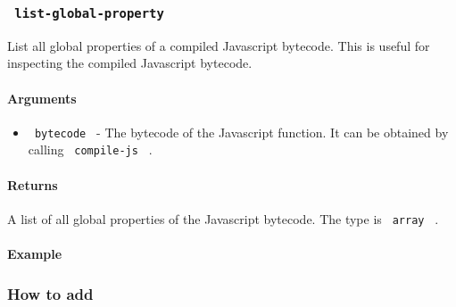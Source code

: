 \begin{Shaded}
\begin{Highlighting}[]
\end{Highlighting}
\end{Shaded}

\subsubsection{\texorpdfstring{\texttt{\ list-global-property\ }}{ list-global-property }}\label{list-global-property}

List all global properties of a compiled Javascript bytecode. This is
useful for inspecting the compiled Javascript bytecode.

\paragraph{Arguments}\label{arguments-3}

\begin{itemize}
\tightlist
\item
  \texttt{\ bytecode\ } - The bytecode of the Javascript function. It
  can be obtained by calling \texttt{\ compile-js\ } .
\end{itemize}

\paragraph{Returns}\label{returns-3}

A list of all global properties of the Javascript bytecode. The type is
\texttt{\ array\ } .

\paragraph{Example}\label{example-4}

\begin{Shaded}
\begin{Highlighting}[]
\end{Highlighting}
\end{Shaded}

\subsubsection{How to add}\label{how-to-add}

